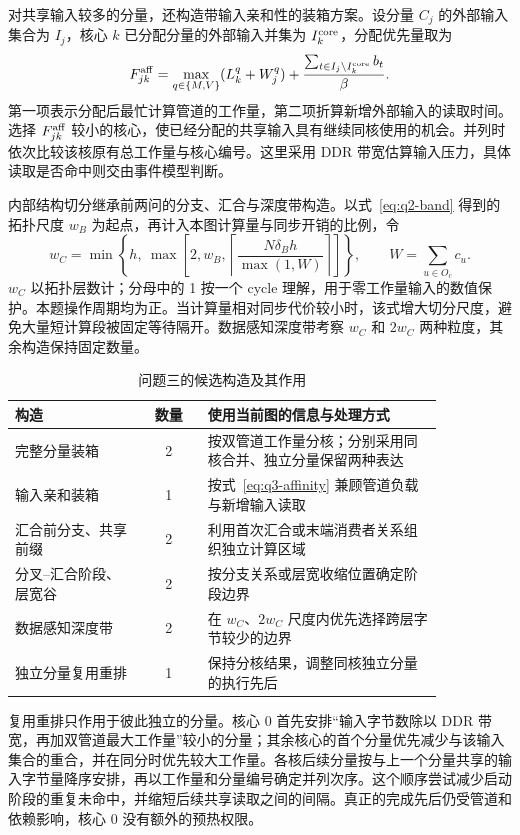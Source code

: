 对共享输入较多的分量，还构造带输入亲和性的装箱方案。设分量 $C_j$ 的外部输入集合为 $I_j$，核心 $k$ 已分配分量的外部输入并集为 $I_k^{\rm core}$，分配优先量取为
\begin{equation}
F_{jk}^{\rm aff}=\max_{q\in\{M,V\}}(L_k^q+W_j^q)
+\frac{\sum_{t\in I_j\setminus I_k^{\rm core}}b_t}{\beta}.
\label{eq:q3-affinity}
\end{equation}
第一项表示分配后最忙计算管道的工作量，第二项折算新增外部输入的读取时间。选择 $F_{jk}^{\rm aff}$ 较小的核心，使已经分配的共享输入具有继续同核使用的机会。并列时依次比较该核原有总工作量与核心编号。这里采用 DDR 带宽估算输入压力，具体读取是否命中则交由事件模型判断。

内部结构切分继承前两问的分支、汇合与深度带构造。以式~\eqref{eq:q2-band} 得到的拓扑尺度 $w_B$ 为起点，再计入本图计算量与同步开销的比例，令
\begin{equation}
w_C=\min\left\{h,\ \max\left[2,w_B,
\left\lceil\frac{N\delta_Bh}{\max(1,W)}\right\rceil\right]\right\},
\qquad W=\sum_{u\in O_c}c_u.
\label{eq:q3-width}
\end{equation}
$w_C$ 以拓扑层数计；分母中的 1 按一个 cycle 理解，用于零工作量输入的数值保护。本题操作周期均为正。当计算量相对同步代价较小时，该式增大切分尺度，避免大量短计算段被固定等待隔开。数据感知深度带考察 $w_C$ 和 $2w_C$ 两种粒度，其余构造保持固定数量。

\begin{table}[htbp]
\centering
\caption{问题三的候选构造及其作用}
\label{tab:q3-candidates}
\begin{tabular}{p{0.30\linewidth}cp{0.55\linewidth}}
\hline
构造 & 数量 & 使用当前图的信息与处理方式 \\
\hline
完整分量装箱 & 2 & 按双管道工作量分核；分别采用同核合并、独立分量保留两种表达 \\
输入亲和装箱 & 1 & 按式~\eqref{eq:q3-affinity} 兼顾管道负载与新增输入读取 \\
汇合前分支、共享前缀 & 2 & 利用首次汇合或末端消费者关系组织独立计算区域 \\
分叉--汇合阶段、层宽谷 & 2 & 按分支关系或层宽收缩位置确定阶段边界 \\
数据感知深度带 & 2 & 在 $w_C$、$2w_C$ 尺度内优先选择跨层字节较少的边界 \\
独立分量复用重排 & 1 & 保持分核结果，调整同核独立分量的执行先后 \\
\hline
\end{tabular}
\end{table}

复用重排只作用于彼此独立的分量。核心 0 首先安排“输入字节数除以 DDR 带宽，再加双管道最大工作量”较小的分量；其余核心的首个分量优先减少与该输入集合的重合，并在同分时优先较大工作量。各核后续分量按与上一个分量共享的输入字节量降序安排，再以工作量和分量编号确定并列次序。这个顺序尝试减少启动阶段的重复未命中，并缩短后续共享读取之间的间隔。真正的完成先后仍受管道和依赖影响，核心 0 没有额外的预热权限。

